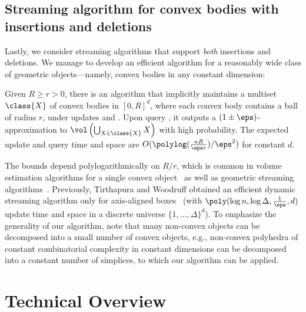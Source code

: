 \subsection{Streaming algorithm for convex bodies with insertions and deletions}
Lastly, we consider streaming algorithms that support \emph{both} insertions and deletions.
We manage to develop an efficient algorithm for a reasonably wide class of geometric objects---namely, convex bodies in any constant dimension:
%
\begin{theorem}
\label{thm:convexalgo}
Given $R \ge r > 0$, there is an algorithm that implicitly maintains a multiset $\class{X}$ of convex bodies in $[0,R]^d$, where each convex body contains a ball of radius $r$, under updates  and . Upon query \est{}, it outputs a $(1\pm\eps)$-approximation to $\vol\left(\bigcup_{X \in \class{X}} X\right)$ with high probability. The expected update and query time and space are $O(\polylog(\frac{nR}{\eps r}) / \eps^2)$ for constant $d$.
\end{theorem}
%
The bounds depend polylogarithmically on $R/r$, which is common in volume estimation algorithms for a single convex object~\cite{DyerFK91} as well as geometric streaming algorithms~\cite{Indyk04,FrahlingIS08}.
%
Previously, Tirthapura and Woodruff obtained an efficient dynamic streaming algorithm only for axis-aligned boxes~\cite{TW12} (with $\poly(\log n, \log \Delta, \frac{1}{\eps}, d)$ update time and space in a discrete universe $\{1,\ldots,\Delta\}^d$).
To emphasize the generality of our algorithm, note that many non-convex objects can be decomposed into a small number of convex objects, e.g., non-convex polyhedra of constant combinatorial complexity in constant dimensions can be decomposed into a constant number of simplices, to which our algorithm can be  applied.
%
\section{Technical Overview}
%
